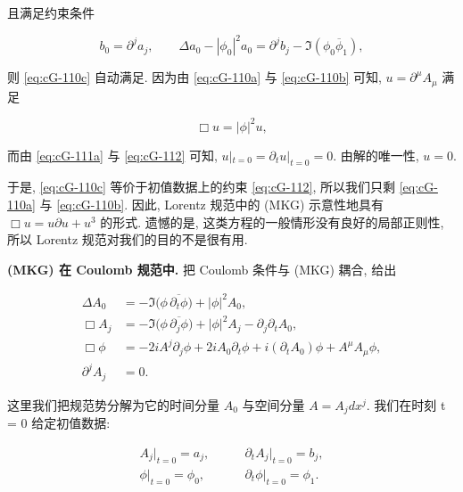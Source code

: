 且满足约束条件

\begin{equation}
b_{0} = \partial^{j}a_{j},  \qquad \Delta a_{0} - |\phi_{0}|^{2}a_{0} = \partial^{j}b_{j} - \Im(\phi_{0}\overline{\phi}_{1}), \label{eq:cG-112}
\end{equation}

则 \eqref{eq:cG-110c} 自动满足. 因为由 \eqref{eq:cG-110a} 与 \eqref{eq:cG-110b} 可知, $u = \partial^{\mu}A_{\mu}$ 满足

\[
\Box u = |\phi|^{2}u, 
\]

而由 \eqref{eq:cG-111a} 与 \eqref{eq:cG-112} 可知, $u|_{t=0} = \partial_t u|_{t=0} = 0$. 由解的唯一性, $u = 0$. 

于是, \eqref{eq:cG-110c} 等价于初值数据上的约束 \eqref{eq:cG-112}, 所以我们只剩 \eqref{eq:cG-110a} 与 \eqref{eq:cG-110b}. 因此, Lorentz 规范中的 (MKG) 示意性地具有 $\Box u = u\partial u + u^{3}$ 的形式. 遗憾的是, 这类方程的一般情形没有良好的局部正则性, 所以 Lorentz 规范对我们的目的不是很有用. 

\noindent\textbf{(MKG) 在 Coulomb 规范中. }把 Coulomb 条件与 (MKG) 耦合, 给出

\begin{subequations}\label{eq:cG-113}
\begin{align}
\Delta A_{0} &= -\Im\big(\phi\, \overline{\partial_{t}\phi}\big) + |\phi|^{2}A_{0},  \label{eq:cG-113a} \\
\Box A_{j} &= -\Im\big(\phi\, \overline{\partial_{j}\phi}\big) + |\phi|^{2}A_{j} - \partial_{j}\partial_{t}A_{0},  \label{eq:cG-113b} \\
\Box \phi &= -2iA^{j}\partial_{j}\phi + 2iA_{0}\partial_{t}\phi + i(\partial_{t}A_{0})\phi + A^{\mu}A_{\mu}\phi,  \label{eq:cG-113c} \\
\partial^{j}A_{j} &= 0. \label{eq:cG-113d}
\end{align}
\end{subequations}

这里我们把规范势分解为它的时间分量 $A_{0}$ 与空间分量 $A = A_{j}dx^{j}$. 我们在时刻 t = 0 给定初值数据:

\begin{subequations}\label{eq:cG-114}
\begin{align}
A_{j}|_{t = 0} = a_{j},  \qquad &\partial_{t}A_{j}|_{t = 0} = b_{j},  \label{eq:cG-114a} \\
\phi|_{t = 0} = \phi_{0},  \qquad &\partial_{t}\phi|_{t = 0} = \phi_{1}. \label{eq:cG-114b}
\end{align}
\end{subequations}

